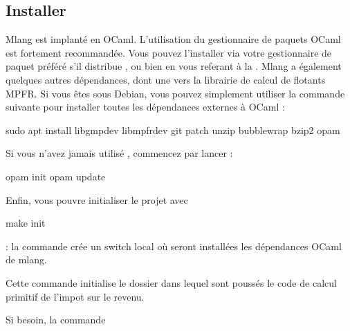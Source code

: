 \documentclass[letterpaper,10pt,french]{sphinxmanual}
\begin{document}
\subsection{Installer}
\label{\detokenize{mlang:installer}}
\sphinxAtStartPar
Mlang est implanté en OCaml. L’utilisation du gestionnaire de paquets OCaml 
est fortement recommandée.
Vous pouvez l’installer via votre gestionnaire de paquet préféré s’il distribue
, ou bien en vous referant à la .
Mlang a également quelques autres dépendances, dont une vers la librairie de calcul
de flotants MPFR. Si vous êtes sous Debian, vous pouvez simplement utiliser la commande
suivante pour installer toutes les dépendances externes à OCaml :

\begin{sphinxVerbatim}[commandchars=\\\{\}]
\PYGZdl{} sudo apt install \PYGZbs{}
	libgmp\PYGZhy{}dev \PYGZbs{}
	libmpfr\PYGZhy{}dev \PYGZbs{}
	git \PYGZbs{}
	patch \PYGZbs{}
	unzip \PYGZbs{}
	bubblewrap \PYGZbs{}
	bzip2 \PYGZbs{}
	opam
\end{sphinxVerbatim}

\sphinxAtStartPar
Si vous n’avez jamais utilisé , commencez par lancer :

\begin{sphinxVerbatim}[commandchars=\\\{\}]
\PYGZdl{} opam init
\PYGZdl{} opam update
\end{sphinxVerbatim}

\sphinxAtStartPar
Enfin, vous pouvre initialiser le projet  avec

\begin{sphinxVerbatim}[commandchars=\\\{\}]
\PYGZdl{} make init
\end{sphinxVerbatim}

\sphinxAtStartPar
{} : la commande  crée
un switch local où seront installées les dépendances OCaml de mlang.

\sphinxAtStartPar
Cette commande initialise le dossier  dans lequel sont poussés
le code de calcul primitif de l’impot sur le revenu.

\sphinxAtStartPar
Si besoin, la commande
\end{document}
